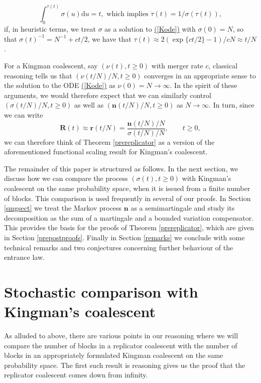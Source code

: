 \documentclass[12pt, leqno]{article}
\renewcommand{\eqref}[1]{\hyperref[#1]{(\ref*{#1})}}
\newcommand{\dd}{{\mathrm d}}
\begin{document}
\[
\int_0^{\tau(t)}\sigma(u)\dd u = t, \text{ which implies  } \dot \tau(t) = 1/\sigma(\tau(t)),
\] 
   if, in heuristic terms, we treat $\sigma$ as a solution to \eqref{Kode} with $\sigma(0) = N$, so that $\sigma(t)^{-1} = N^{-1}+ ct/2$, we have that 
  $\tau(t)\approx 2(\exp\{ct/2\}-1)/cN\approx t/N$. 


For a Kingman coalescent, say $(\nu(t), t\geq0)$ with merger rate $c$, classical reasoning tells us that $(\nu(t/N)/N, t\geq0)$  converges in an appropriate sense to the solution to   the ODE \eqref{Kode} as $\nu(0) = N\to\infty$. 
 In the spirit of these arguments, we would therefore expect that we can similarly control $(\sigma(t/N)/N, t\geq0)$  as well as $(\bm{n}(t/N)/N, t\geq0)$ as $N\to\infty$. In turn,  since we can write 
   \[
   \bm{R}(t)\approx \bm{r}(t/N) = \frac{\bm{n}(t/N)/N}{\sigma(t/N)/N},\qquad t\geq0,
   \] 
   we can therefore think of Theorem \ref{prereplicator} as a version of the aforementioned functional scaling result for Kingman's coalescent. 
   
   






\medskip

The remainder of this paper is structured as follows. In the next section, we discuss how we can compare the process $(\sigma(t), t\geq0)$ with Kingman's coalescent on the same probability space, when it is issued from a finite number of blocks. This comparison  is used frequently in several of our proofs. %
In Section \ref{smgsect} we treat the Markov process $\bm n$ as a semimartingale and study its decomposition as the sum of a martingale and a bounded variation compensator. This provides the basis for the proofs of Theorem \ref{prereplicator}, which are given in Section \ref{prepostproofs}. Finally in Section \ref{remarks} we conclude with some technical remarks and two conjectures concerning further behaviour of the entrance law.




\section{Stochastic comparison with Kingman's coalescent}\label{proof1}
As alluded to above, there are various points in our reasoning where we will compare the number of blocks in a replicator coalescent with the number of blocks in an appropriately formulated Kingman coalescent on the same probability space. 
The first such result is reasoning  gives us the proof that the replicator coalescent comes down from infinity.
\end{document}
